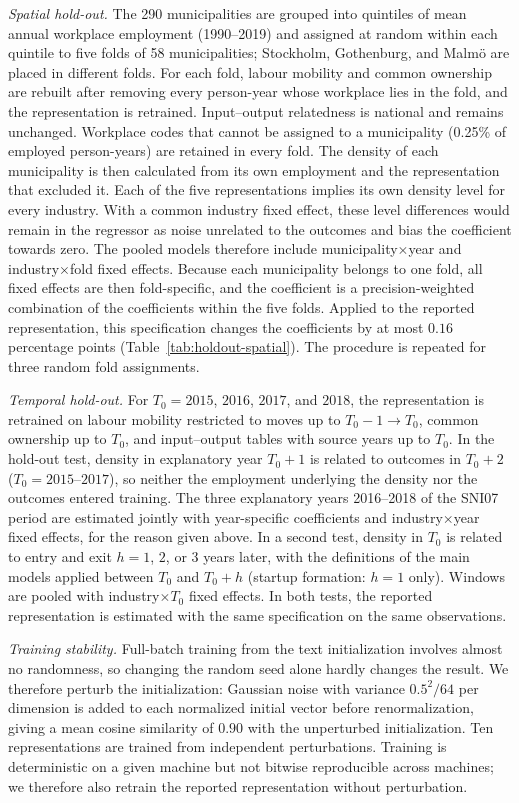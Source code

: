 \documentclass[9pt,twoside]{pnas-new}
\begin{document}
\textit{Spatial hold-out.} The 290 municipalities are grouped into quintiles of mean annual workplace employment (1990--2019) and assigned at random within each quintile to five folds of 58 municipalities; Stockholm, Gothenburg, and Malmö are placed in different folds. For each fold, labour mobility and common ownership are rebuilt after removing every person-year whose workplace lies in the fold, and the representation is retrained. Input--output relatedness is national and remains unchanged. Workplace codes that cannot be assigned to a municipality (0.25\% of employed person-years) are retained in every fold. The density of each municipality is then calculated from its own employment and the representation that excluded it. Each of the five representations implies its own density level for every industry. With a common industry fixed effect, these level differences would remain in the regressor as noise unrelated to the outcomes and bias the coefficient towards zero. The pooled models therefore include municipality$\times$year and industry$\times$fold fixed effects. Because each municipality belongs to one fold, all fixed effects are then fold-specific, and the coefficient is a precision-weighted combination of the coefficients within the five folds. Applied to the reported representation, this specification changes the coefficients by at most $0.16$ percentage points (Table~\ref{tab:holdout-spatial}). The procedure is repeated for three random fold assignments.

\textit{Temporal hold-out.} For $T_0=2015$, $2016$, $2017$, and $2018$, the representation is retrained on labour mobility restricted to moves up to $T_0-1\rightarrow T_0$, common ownership up to $T_0$, and input--output tables with source years up to $T_0$. In the hold-out test, density in explanatory year $T_0+1$ is related to outcomes in $T_0+2$ ($T_0=2015$--$2017$), so neither the employment underlying the density nor the outcomes entered training. The three explanatory years 2016--2018 of the SNI07 period are estimated jointly with year-specific coefficients and industry$\times$year fixed effects, for the reason given above. In a second test, density in $T_0$ is related to entry and exit $h=1$, $2$, or $3$ years later, with the definitions of the main models applied between $T_0$ and $T_0+h$ (startup formation: $h=1$ only). Windows are pooled with industry$\times T_0$ fixed effects. In both tests, the reported representation is estimated with the same specification on the same observations.

\textit{Training stability.} Full-batch training from the text initialization involves almost no randomness, so changing the random seed alone hardly changes the result. We therefore perturb the initialization: Gaussian noise with variance $0.5^2/64$ per dimension is added to each normalized initial vector before renormalization, giving a mean cosine similarity of $0.90$ with the unperturbed initialization. Ten representations are trained from independent perturbations. Training is deterministic on a given machine but not bitwise reproducible across machines; we therefore also retrain the reported representation without perturbation.
\end{document}
